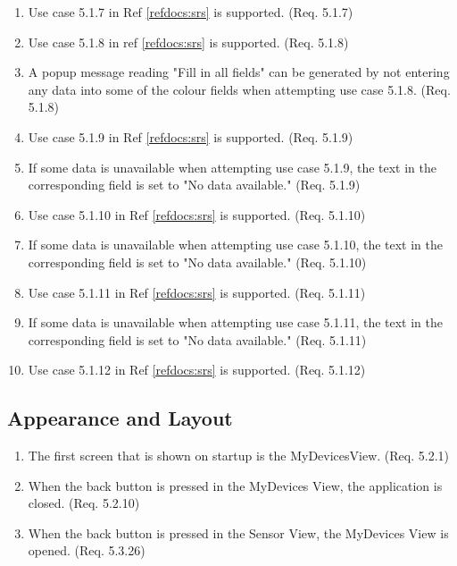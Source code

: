 \documentclass[a4paper]{article}
\newlength{\testlabellength}
\newenvironment{testlist}{\begin{enumerate}[label=\bfseries Test \thesubsection.\arabic* , labelindent=0pt, labelwidth=\testlabellength , leftmargin=2cm]}{\end{enumerate}}
\begin{document}
\begin{appendices}
\begin{testlist}
	\item Use case 5.1.7 in Ref \ref{refdocs:srs} is supported. (Req. 5.1.7)
	
	\item Use case 5.1.8 in ref \ref{refdocs:srs} is supported. (Req. 5.1.8)
	
	\item A popup message reading "Fill in all fields" can be generated by not entering any data into some of the colour fields when attempting use case 5.1.8. (Req. 5.1.8)
	
	\item Use case 5.1.9 in Ref \ref{refdocs:srs} is supported. (Req. 5.1.9)
	
	\item If some data is unavailable when attempting use case 5.1.9, the text in the corresponding field is set to "No data available." (Req. 5.1.9)
	
	\item Use case 5.1.10 in Ref \ref{refdocs:srs} is supported. (Req. 5.1.10)
	
	\item If some data is unavailable when attempting use case 5.1.10, the text in the corresponding field is set to "No data available." (Req. 5.1.10)
	
	\item Use case 5.1.11 in Ref \ref{refdocs:srs} is supported. (Req. 5.1.11)
	
	\item If some data is unavailable when attempting use case 5.1.11, the text in the corresponding field is set to "No data available." (Req. 5.1.11)
	
	\item Use case 5.1.12 in Ref \ref{refdocs:srs} is supported. (Req. 5.1.12)
\end{testlist}

\subsection{Appearance and Layout}

\begin{testlist}
	\item The first screen that is shown on startup is the MyDevicesView. (Req. 5.2.1)
	
	\item When the back button is pressed in the MyDevices View, the application is closed. (Req. 5.2.10)	
	
	\item When the back button is pressed in the Sensor View, the MyDevices View is opened. (Req. 5.3.26)
	

\end{testlist}
\end{appendices}
\end{document}
